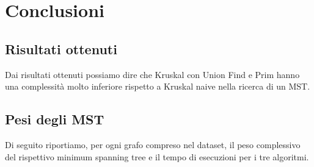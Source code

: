\chapter{Conclusioni\label{sec:conclusioni}}

\section{Risultati ottenuti\label{sec:risultati-ottenuti}}
Dai risultati ottenuti possiamo dire che Kruskal con Union Find e Prim hanno una complessità molto inferiore rispetto a Kruskal naive nella ricerca di un MST.

\section{Pesi degli MST\label{sec:pesi-mst}}
Di seguito riportiamo, per ogni grafo compreso nel dataset, il peso complessivo del rispettivo minimum spanning tree e il tempo di esecuzioni per i tre algoritmi.


